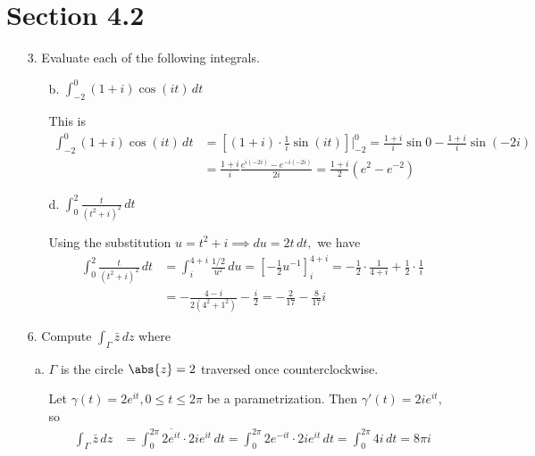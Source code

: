 \documentclass{article}
\begin{document}
\section*{Section 4.2}

\begin{itemize}
	\item[3.] Evaluate each of the following integrals.
		\begin{itemize}
			\item[b.] $\int_{-2}^0 (1+i)\cos(it)\, dt$
				\begin{soln}
					This is
					\begin{align*}
						\int_{-2}^0 (1+i)\cos(it)\, dt &= \left[ (1+i)\cdot \frac{1}{i}\sin(it) \right]\bigg|_{-2}^0 = \frac{1+i}{i}\sin 0 - \frac{1+i}{i}\sin(-2i) \\
						&= \frac{1+i}{i} \frac{e^{i(-2i)} - e^{-i(-2i)}}{2i} = \frac{1+i}{2}\left( e^2-e^{-2} \right)
					\end{align*}
				\end{soln}

				\newpage
			\item[d.] $\int_0^2 \frac{t}{(t^2+i)^2}\, dt$
				\begin{soln}
					Using the substitution $u=t^2+i\implies du=2t\, dt,$ we have
					\begin{align*}
						\int_0^2 \frac{t}{(t^2+i)^2}\, dt &= \int_i^{4+i} \frac{1/2}{u^2}\, du = \left[ -\frac{1}{2} u^{-1} \right]_{i}^{4+i} = -\frac{1}{2}\cdot\frac{1}{4+i} + \frac{1}{2}\cdot\frac{1}{i} \\
						&= -\frac{4-i}{2(4^2+1^2)} - \frac{i}{2} = -\frac{2}{17} - \frac{8}{17}i
					\end{align*}
				\end{soln}

		\end{itemize}

	\item[6.] Compute $\int_{\Gamma}\bar z\, dz$ where
		\begin{enumerate}[(a)]
			\item $\Gamma$ is the circle $\abs{z}=2$ traversed once counterclockwise. 
				\begin{soln}
					Let $\gamma(t) = 2e^{it}, 0\le t\le 2\pi$ be a parametrization. Then $\gamma'(t)=2ie^{it},$ so 
					\begin{align*}
						\int_{\Gamma} \bar z\, dz &= \int_0^{2\pi} \overline{2e^{it}} \cdot 2ie^{it}\, dt = \int_{0}^{2\pi} 2e^{-it}\cdot 2ie^{it}\, dt = \int_0^{2\pi} 4i\, dt = 8\pi i
					\end{align*}
				\end{soln}


\end{enumerate}
\end{itemize}
\end{document}
